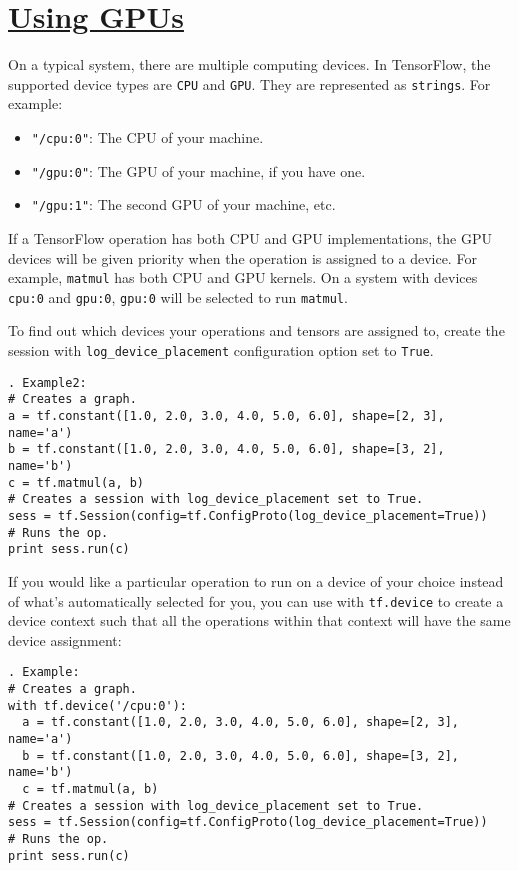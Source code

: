 \documentclass[11pt,a4paper]{article}
\begin{document}
\section{\href{www.tensorflow.org/versions/r0.11/how_tos/using_gpu/index.html}{Using GPUs}}
On a typical system, there are multiple computing devices. In TensorFlow, the supported device types are \texttt{CPU} and \texttt{GPU}. They are represented as \texttt{strings}. For example:
\begin{itemize}
	\item \texttt{"/cpu:0"}: The CPU of your machine. 
	\item \texttt{"/gpu:0"}: The GPU of your machine, if you have one. 
	\item \texttt{"/gpu:1"}: The second GPU of your machine, etc. 
\end{itemize}
If a TensorFlow operation has both CPU and GPU implementations, the GPU devices will be given priority when the operation is assigned to a device. For example, \texttt{matmul} has both CPU and GPU kernels. On a system with devices \texttt{cpu:0} and \texttt{gpu:0}, \texttt{gpu:0} will be selected to run \texttt{matmul}.

To find out which devices your operations and tensors are assigned to, create the session with \texttt{log\_device\_placement} configuration option set to \texttt{True}.
\begin{lstlisting}. Example2: 
# Creates a graph.
a = tf.constant([1.0, 2.0, 3.0, 4.0, 5.0, 6.0], shape=[2, 3], name='a')
b = tf.constant([1.0, 2.0, 3.0, 4.0, 5.0, 6.0], shape=[3, 2], name='b')
c = tf.matmul(a, b)
# Creates a session with log_device_placement set to True.
sess = tf.Session(config=tf.ConfigProto(log_device_placement=True))
# Runs the op.
print sess.run(c)
  \end{lstlisting}
If you would like a particular operation to run on a device of your choice instead of what's automatically selected for you, you can use with \texttt{tf.device} to create a device context such that all the operations within that context will have the same device assignment: 
\begin{lstlisting}. Example: 
# Creates a graph.
with tf.device('/cpu:0'):
  a = tf.constant([1.0, 2.0, 3.0, 4.0, 5.0, 6.0], shape=[2, 3], name='a')
  b = tf.constant([1.0, 2.0, 3.0, 4.0, 5.0, 6.0], shape=[3, 2], name='b')
  c = tf.matmul(a, b)
# Creates a session with log_device_placement set to True.
sess = tf.Session(config=tf.ConfigProto(log_device_placement=True))
# Runs the op.
print sess.run(c)
  \end{lstlisting}
\end{document}
